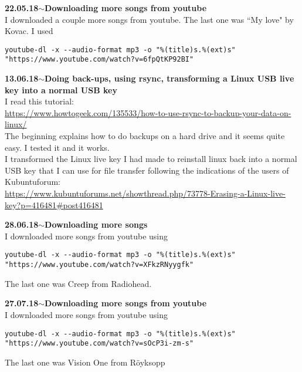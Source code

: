 \documentclass[11pt,a4paper]{article}
\newenvironment{loggentry}[2]%
{\noindent\textbf{#1}\hspace{1cm}$\mathbf{\sim}$\text{ }\textbf{#2}\\}{\vspace{0.5cm}}
\begin{document}
\begin{loggentry}{22.05.18}{Downloading more songs from youtube}
I downloaded a couple more songs from youtube. The last one was ``My love" by Kovac. I used
\begin{verbatim}
youtube-dl -x --audio-format mp3 -o "%(title)s.%(ext)s" "https://www.youtube.com/watch?v=6fpQtKP92BI"
\end{verbatim}
\end{loggentry}

\begin{loggentry}{13.06.18}{Doing back-ups, using rsync, transforming a Linux USB live key into a normal USB key}
I read this tutorial:\\
\url{https://www.howtogeek.com/135533/how-to-use-rsync-to-backup-your-data-on-linux/}\\
The beginning explains how to do backups on a hard drive and it seems quite easy. I tested it and it works.\\

I transformed the Linux live key I had made to reinstall linux back into a normal USB key that I can use for file transfer following the indications of the users of Kubuntuforum:\\
\url{https://www.kubuntuforums.net/showthread.php/73778-Erasing-a-Linux-live-key?p=416481#post416481}\\
\end{loggentry}

\begin{loggentry}{28.06.18}{Downloading more songs}
I downloaded more songs from youtube using
\begin{verbatim}
youtube-dl -x --audio-format mp3 -o "%(title)s.%(ext)s" "https://www.youtube.com/watch?v=XFkzRNyygfk"
\end{verbatim}
The last one was Creep from Radiohead.
\end{loggentry}

\begin{loggentry}{27.07.18}{Downloading more songs from youtube}
I downloaded more songs from youtube using
\begin{verbatim}
youtube-dl -x --audio-format mp3 -o "%(title)s.%(ext)s" "https://www.youtube.com/watch?v=sOcP3i-zm-s"
\end{verbatim}
The last one was Vision One from Röyksopp
\end{loggentry}
\end{document}
